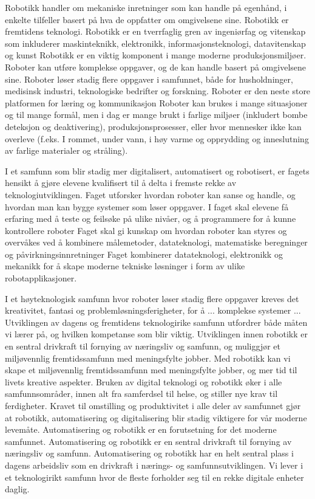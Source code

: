 




Robotikk handler om mekaniske inretninger som kan handle på egenhånd, i enkelte tilfeller basert på hva de oppfatter om omgivelsene sine.
Robotikk er fremtidens teknologi.
Robotikk er en tverrfaglig gren av ingeniørfag og vitenskap som inkluderer maskinteknikk, elektronikk, informasjonsteknologi, datavitenskap og kunst
Robotikk er en viktig komponent i mange moderne produksjonsmiljøer.
Roboter kan utføre komplekse oppgaver, og de kan handle basert på omgivelsene sine.
Roboter løser stadig flere oppgaver i samfunnet, både for husholdninger, medisinsk industri, teknologiske bedrifter og forskning.
Roboter er den neste store platformen for læring og kommunikasjon
Roboter kan brukes i mange situasjoner og til mange formål, men i dag er mange brukt i farlige miljøer (inkludert bombe deteksjon og deaktivering), produksjonsprosesser, eller hvor mennesker ikke kan overleve (f.eks. I rommet, under vann, i høy varme og opprydding og inneslutning av farlige materialer og stråling).


I et samfunn som blir stadig mer digitalisert, automatisert og robotisert, er fagets hensikt å gjøre elevene kvalifisert til å delta i fremste rekke av teknologiutviklingen.
Faget utforsker hvordan roboter kan sanse og handle, og hvordan man kan bygge systemer som løser oppgaver.
I faget skal elevene få erfaring med å teste og feilsøke på ulike nivåer, og å programmere for å kunne kontrollere roboter
Faget skal gi kunskap om hvordan roboter kan styres og overvåkes ved å kombinere målemetoder, datateknologi, matematiske beregninger og påvirkningsinnretninger
Faget kombinerer datateknologi, elektronikk og mekanikk for å skape moderne tekniske løsninger i form av ulike robotapplikasjoner.


I et høyteknologisk samfunn hvor roboter løser stadig flere oppgaver kreves det kreativitet, fantasi og problemløsningsferigheter, for å ... komplekse systemer ...
Utviklingen av dagens og fremtidens teknologirike samfunn utfordrer både måten vi lærer på, og hvilken kompetanse som blir viktig.
Utviklingen innen robotikk er en sentral drivkraft til fornying av næringsliv og samfunn, og muliggjør et miljøvennlig fremtidssamfunn med meningsfylte jobber.
Med robotikk kan vi skape et miljøvennlig fremtidssamfunn med meningsfylte jobber, og mer tid til livets kreative aspekter.
Bruken av digital teknologi og robotikk øker i alle samfunnsområder, innen alt fra samferdsel til helse, og stiller nye krav til ferdigheter.
Kravet til omstilling og produktivitet i alle deler av samfunnet gjør at robotikk, automatisering og digitalisering blir stadig viktigere for vår moderne levemåte.
Automatisering og robotikk er en forutsetning for det moderne samfunnet.
Automatisering og robotikk er en sentral drivkraft til fornying av næringsliv og samfunn.
Automatisering og robotikk har en helt sentral plass i dagens arbeidsliv som en drivkraft i nærings- og samfunnsutviklingen.
Vi lever i et teknologirikt samfunn hvor de fleste forholder seg til en rekke digitale enheter daglig.


